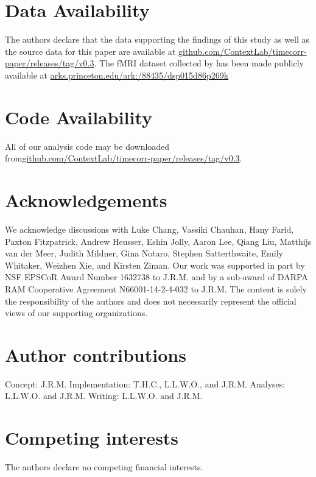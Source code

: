 \documentclass[english]{article}
\begin{document}
\section*{Data Availability}

The authors declare that the data supporting the findings of this
study as well as the source data for this paper are available at \href{https://github.com/ContextLab/timecorr-paper/releases/tag/v0.3}{github.com/ContextLab/timecorr-paper/releases/tag/v0.3}. The fMRI dataset collected by \cite{SimoEtal16} has been made publicly available at
\href{http://arks.princeton.edu/ark:/88435/dsp015d86p269k}{arks.princeton.edu/ark:/88435/dsp015d86p269k}

\section*{Code Availability}

All of our analysis code may be downloaded from\href{https://github.com/ContextLab/timecorr-paper/releases/tag/v0.3}{github.com/ContextLab/timecorr-paper/releases/tag/v0.3}.


\section*{Acknowledgements}
We acknowledge discussions with Luke Chang, Vassiki Chauhan, Hany
Farid, Paxton Fitzpatrick, Andrew Heusser, Eshin Jolly, Aaron Lee,
Qiang Liu, Matthijs van der Meer, Judith Mildner, Gina Notaro, Stephen
Satterthwaite, Emily Whitaker, Weizhen Xie, and Kirsten Ziman. Our
work was supported in part by NSF EPSCoR Award Number 1632738 to
J.R.M. and by a sub-award of DARPA RAM Cooperative Agreement
N66001-14-2-4-032 to J.R.M.  The content is solely the responsibility
of the authors and does not necessarily represent the official views
of our supporting organizations.

\section*{Author contributions}
Concept: J.R.M.  Implementation: T.H.C., L.L.W.O., and J.R.M.
Analyses: L.L.W.O. and J.R.M.  Writing: L.L.W.O. and J.R.M.

\section*{Competing interests}
The authors declare no competing financial interests.



\end{document}
